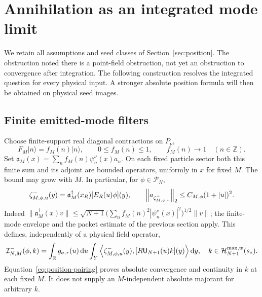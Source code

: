 \section{Annihilation as an integrated mode limit}
\label{sec:annihilation}
We retain all assumptions and seed classes of Section~\ref{sec:position}.
The obstruction noted there is a point-field obstruction, not yet an
obstruction to convergence after integration. The following construction
resolves the integrated question for every physical input. A stronger
absolute position formula will then be obtained on physical seed images.

\subsection{Finite emitted-mode filters}
Choose finite-support real diagonal contractions on $P_\nu$,
\begin{equation}
 F_M|n\rangle=f_M(n)|n\rangle,\qquad
 0\le f_M(n)\le1,\qquad f_M(n)\longrightarrow1\quad(n\in\mathbb Z).
 \label{eq:mode-filter}
\end{equation}
Set $\mathfrak a_M(x)=\sum_n f_M(n)\psi_n^\nu(x)a_n$.
On each fixed particle sector both this finite sum and its adjoint are
bounded operators, uniformly in $x$ for fixed $M$. The bound may grow with
$M$. In particular, for $\phi\in\mathcal P_N$,
\begin{equation}
 \zeta^-_{M,\phi,u}(y)=\mathfrak a_M^\dagger(x_R)[E_R(u)\phi](y),
 \qquad
 \left\lVert a_{\zeta^-_{M,\phi,u}}\right\rVert_2\le C_{M,\phi}(1+|u|)^2.
 \label{eq:ann-test-bound}
\end{equation}
Indeed $\|\mathfrak a_M^\dagger(x)v\|\le
\sqrt{N+1}\big(\sum_n f_M(n)^2|\psi_n^\nu(x)|^2\big)^{1/2}\|v\|$;
the finite-mode envelope and the packet estimate of the previous section
apply. This defines, independently of a physical field operator,
\begin{equation}
 \mathcal I^-_{N,M}(\phi,k)=
 \int_{\mathbb R}g_{\sigma,\tau}(u)\mathop{}\!\mathrm d u\int_Y
 \left\langle\zeta^-_{M,\phi,u}(y),[R\mathsf U_{N+1}(u)k](y)\right\rangle\mathop{}\!\mathrm d y,
 \quad k\in\mathcal H_{N+1}^{\max,w}(s_*).
 \label{eq:ann-cut-integral}
\end{equation}
Equation~\eqref{eq:position-pairing} proves absolute convergence and
continuity in $k$ at each fixed $M$. It does not supply an $M$-independent
absolute majorant for arbitrary $k$.

